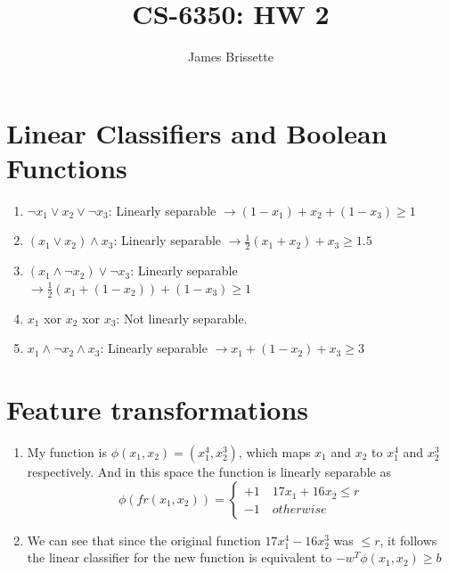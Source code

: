 \documentclass[11pt,a4paper]{article}
\author{James Brissette}
\title{CS-6350: HW 2}
\begin{document}
	\maketitle
	
	\section{Linear Classifiers and Boolean Functions}
		\begin{enumerate}
			\item $\neg x_1 \vee x_2 \vee \neg x_3 $: Linearly separable $\rightarrow (1-x_1)+x_2 + (1-x_3) \geq 1$
			\item $(x_1 \vee x_2) \wedge x_3$: Linearly separable $\rightarrow \frac{1}{2}(x_1 + x_2) + x_3 \geq 1.5$
			\item $(x_1 \wedge \neg x_2) \vee \neg x_3$: Linearly separable $\rightarrow \frac{1}{2}(x_1 + (1-x_2))+(1-x_3) \geq 1$
			\item $x_1$ xor $x_2$ xor $x_3$: Not linearly separable.
			\item $x_1 \wedge \neg x_2 \wedge x_3$: Linearly separable $\rightarrow x_1 + (1-x_2) + x_3 \geq 3$
		\end{enumerate}
	
	\section{Feature transformations}
		\begin{enumerate}
			\item My function is $\phi ( x_{1} , x_{2} ) = ( x_{1}^{4} , x_{2}^{3} )$, which maps $x_{1}$ and $x_{2}$ to $x_{1}^{4}$ and $x_{2}^{3}$ respectively. And in this space the function is linearly separable as $$\phi(fr(x_1,x_2)) = \begin{cases}
			+1 \quad 17x_1+16x_2 \leq r \\
			-1 \quad otherwise
			\end{cases}$$
			\item We can see that since the original function $17x_1^4-16x_2^3$ was $\leq r$, it follows the linear classifier for the new function is equivalent to $-w^T\phi (x_1,x_2) \geq b$
		\end{enumerate}
	
\end{document}
